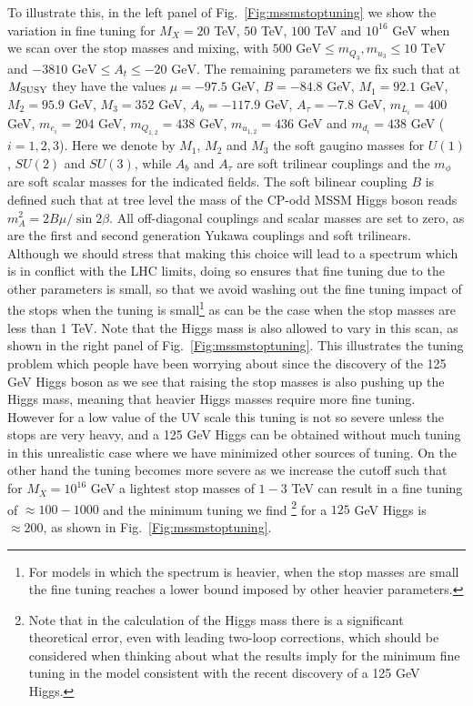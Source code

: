 \documentclass[preprint,amsmath,amssymb,aps,superscriptaddress,prd,
showpacs,floatfix,nofootinbib]{revtex4-1}
\begin{document}
To illustrate this, in the left panel of Fig.~\ref{Fig:mssmstoptuning}
we show the variation in fine tuning for $M_X = 20$ TeV, $50$ TeV, $100$
TeV and $10^{16}$ GeV when we scan over the stop masses and mixing,
with $500 \textrm{ GeV} \leq m_{Q_3} , m_{u_3} \leq 10 \textrm{ TeV}$ and
$-3810\textrm{ GeV} \leq A_t \leq -20 \textrm{ GeV}$.  The remaining
parameters we fix such that at $M_{\rm SUSY}$ they have the values
$\mu = -97.5$ GeV, $B = -84.8$ GeV, $M_1 = 92.1$ GeV, $M_2 = 95.9$ GeV,
$M_3 = 352$ GeV, $A_b = -117.9$ GeV, $A_\tau = -7.8$ GeV, $m_{L_i} = 400$ GeV,
$m_{e_i} = 204$ GeV, $m_{Q_{1,2}} = 438$ GeV, $m_{u_{1,2}} = 436$ GeV and
$m_{d_i} = 438$ GeV ($i = 1 , 2 , 3$).  Here we denote by $M_1$, $M_2$ and
$M_3$ the soft gaugino masses for $U(1)$, $SU(2)$ and $SU(3)$, while $A_b$ and
$A_\tau$ are soft trilinear couplings and the $m_\phi$ are soft scalar
masses for the indicated fields.  The soft bilinear coupling $B$ is defined
such that at tree level the mass of the CP-odd MSSM Higgs boson reads
$m_A^2 = 2 B \mu / \sin 2\beta$.  All off-diagonal couplings and scalar masses
are set to zero, as are the first and second generation Yukawa couplings
and soft trilinears.  Although we should stress that making
this choice will lead to a spectrum which is in conflict with the LHC
limits, doing so ensures that fine tuning due to the other parameters
is small, so that we avoid washing out the fine tuning impact of the
stops when the tuning is small\footnote{For models in which the
spectrum is heavier, when the stop masses are small the fine tuning
reaches a lower bound imposed by other heavier parameters.} as can
be the case when the stop masses are less than 1 TeV.  Note that the
Higgs mass is also allowed to vary in this scan, as shown in the right
panel of Fig.~\ref{Fig:mssmstoptuning}.  This illustrates the tuning
problem which people have been worrying about since the discovery of
the 125 GeV Higgs boson as we see that raising the stop masses is also
pushing up the Higgs mass, meaning that heavier Higgs masses require
more fine tuning.  However for a low value of the UV scale this tuning
is not so severe unless the stops are very heavy, and a 125 GeV Higgs
can be obtained without much tuning in this unrealistic case where we
have minimized other sources of tuning.  On the other hand the tuning
becomes more severe as we increase the cutoff such that for $M_X =
10^{16}$ GeV a lightest stop masses of $1-3$ TeV can result in a fine
tuning of $\approx 100 - 1000$ and the minimum tuning we find \footnote{Note that in the calculation of the Higgs mass there is a significant theoretical error, even with leading two-loop corrections, which should be considered when thinking about what the results imply for the minimum fine tuning in the model consistent with the recent discovery of a 125 GeV Higgs.}
for a $125$ GeV Higgs is $\approx 200$, as shown in
Fig.~\ref{Fig:mssmstoptuning}.
\end{document}
